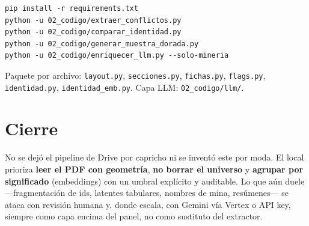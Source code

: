 \documentclass[11pt,a4paper]{article}
\begin{document}
\begin{verbatim}
pip install -r requirements.txt
python -u 02_codigo/extraer_conflictos.py
python -u 02_codigo/comparar_identidad.py
python -u 02_codigo/generar_muestra_dorada.py
python -u 02_codigo/enriquecer_llm.py --solo-mineria
\end{verbatim}

Paquete por archivo: \texttt{layout.py}, \texttt{secciones.py}, \texttt{fichas.py}, \texttt{flags.py}, \texttt{identidad.py}, \texttt{identidad\_emb.py}. Capa LLM: \texttt{02\_codigo/llm/}.

\section{Cierre}

No se dejó el pipeline de Drive por capricho ni se inventó este por moda. El local prioriza \textbf{leer el PDF con geometría}, \textbf{no borrar el universo} y \textbf{agrupar por significado} (embeddings) con un umbral explícito y auditable. Lo que aún duele ---fragmentación de ids, latentes tabulares, nombres de mina, resúmenes--- se ataca con revisión humana y, donde escala, con Gemini vía Vertex o API key, siempre como capa encima del panel, no como sustituto del extractor.
\end{document}
